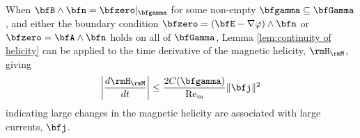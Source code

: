     \begin{corollary}
        When $\bfB\wedge\bfn  =  \bfzero|_{\bfgamma}$ for some non-empty $\bfgamma  \subseteq  \bfGamma$, and either the boundary condition $\bfzero  =  (\bfE - \nabla\varphi)\wedge\bfn$ or $\bfzero  =  \bfA\wedge\bfn$ holds on all of $\bfGamma$, Lemma \ref{lem:continuity of helicity} can be applied to the time derivative of the magnetic helicity, $\rmH_{\rmM}$, giving
        \begin{equation}
            \left|\frac{d\rmH_{\rmM}}{dt}\right|  \leq  \frac{2C(\bfgamma)}{\rmRem}\|\bfj\|^{2}
        \end{equation}
        indicating large changes in the magnetic helicity are associated with large currents, $\bfj$.
    \end{corollary}

    
    \line
    